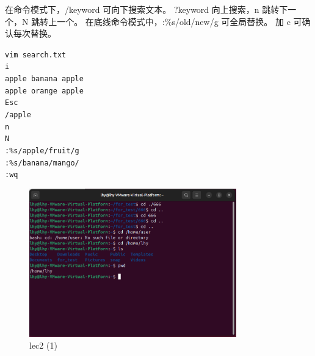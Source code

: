 \documentclass[a4paper, 12pt]{article}
\begin{document}
\newpage
\begin{tcolorbox}[instancestyle, title=实例20：查找与全局替换]
在命令模式下，/keyword 可向下搜索文本。
?keyword 向上搜索，n 跳转下一个，N 跳转上一个。
在底线命令模式中，:\%s/old/new/g 可全局替换。
加 c 可确认每次替换。

\texttt{vim search.txt} \\
\texttt{i} \\
\texttt{apple banana apple} \\
\texttt{apple orange apple} \\
\texttt{Esc} \\
\texttt{/apple} \\
\texttt{n} \\
\texttt{N} \\
\texttt{:\%s/apple/fruit/g} \\
\texttt{:\%s/banana/mango/} \\
\texttt{:wq}
\end{tcolorbox}

\begin{figure}[htbp]
    \centering
    \includegraphics[width=0.8\textwidth]{lec2 (1).png}
    \caption{lec2 (1)}
    \label{fig:lec2-1}
\end{figure}
\end{document}
